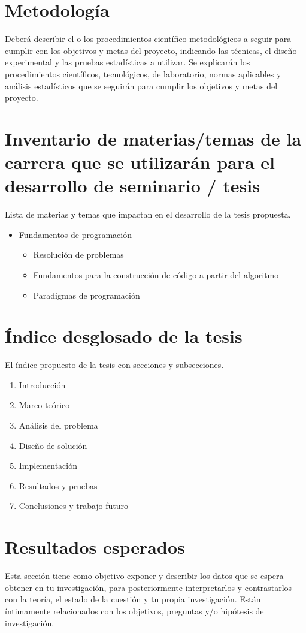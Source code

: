 \documentclass[letterpaper,12pt,oneside]{article}
\begin{document}
\section{Metodología}
Deberá describir el o los procedimientos científico-metodológicos a seguir para cumplir con los objetivos y metas del proyecto, indicando las técnicas, el diseño experimental y las pruebas estadísticas a utilizar. Se explicarán los procedimientos científicos, tecnológicos, de laboratorio, normas aplicables y análisis estadísticos que se seguirán para cumplir los objetivos y metas del proyecto. 

\section{Inventario de materias/temas de la carrera que se utilizarán para el desarrollo de seminario / tesis}
Lista de materias y temas que impactan en el desarrollo de la tesis propuesta.

\begin{itemize}
    \item Fundamentos de programación
    \begin{itemize}
        \item Resolución de problemas 
        \item Fundamentos para la construcción de código a partir del algoritmo
        \item Paradigmas de programación
    \end{itemize}
\end{itemize}

\section{Índice desglosado de la tesis}
El índice propuesto de la tesis con secciones y subsecciones.

\begin{enumerate}
    \item Introducción
    \item Marco teórico
    \item Análisis del problema
    \item Diseño de solución
    \item Implementación
    \item Resultados y pruebas
    \item Conclusiones y trabajo futuro
\end{enumerate}

\section{Resultados esperados}
Esta sección tiene como objetivo exponer y describir los datos que se espera obtener en tu investigación, para posteriormente interpretarlos y contrastarlos con la teoría, el estado de la cuestión y tu propia investigación. Están íntimamente relacionados con los objetivos, preguntas y/o hipótesis de investigación. 
\end{document}
